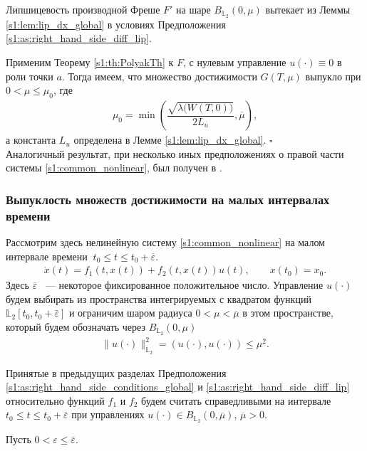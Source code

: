\documentclass[../main.tex]{subfiles}
\begin{document}
Липшицевость производной Фреше $F'$ на шаре $B_{\mathbb{L}_2}(0,\mu)$ вытекает из Леммы \ref{s1:lem:lip_dx_global} в условиях Предположения \ref{s1:as:right_hand_side_diff_lip}. 
 
Применим Теорему \ref{s1:th:PolyakTh} к $F$, с нулевым управление $u(\cdot) \equiv 0$ в роли точки $a$. 
Тогда имеем, что множество достижимости $G(T,\mu)$ выпукло при $ 0 < \mu \leqslant \mu_0 $, где 
\begin{gather}\label{s1:mu0}
 \mu_0 = \min\left( \dfrac{\sqrt{\lambda\big(W(T,0)\big)}}{2L_u}, \overline{\mu} \right), 
\end{gather}
а константа $L_u $ определена в Лемме \ref{s1:lem:lip_dx_global}. 
\hfill$\square$\\[1ex]%
Аналогичный результат, при несколько иных предположениях о правой части системы \eqref{s1:common_nonlinear}, был получен в \cite{Polyak2004}.
 
\subsubsection{Выпуклость множеств достижимости на малых интервалах времени}
\label{s1:small_time_subsection}
Рассмотрим здесь нелинейную систему \eqref{s1:common_nonlinear} на малом интервале времени $\ t_0 \leqslant t \leqslant t_0 + \overline{\varepsilon} $.
\begin{gather}\label{s1:common_nonlinear_small_time}
 \dot{x}(t)=f_1(t,x(t))+f_2(t,x(t))u(t), \qquad x(t_0) = x_0.
\end{gather}
Здесь $ \overline{\varepsilon} $ ~--- некоторое фиксированное положительное число.
Управление $u(\cdot)$ будем выбирать из пространства интегрируемых с квадратом функций $\mathbb{L}_2[t_0,t_0+\bar{\varepsilon}]$ и ограничим шаром радиуса $ 0 < \mu < \overline{\mu} $ в этом пространстве, который будем обозначать через $B_{\mathbb{L}_2}(0, \mu)$
\begin{gather*}
 \lVert u(\cdot)\rVert^2_{\mathbb{L}_2} = \left(u(\cdot),u(\cdot) \right) \leqslant \mu^2.
\end{gather*}

Принятые в предыдущих разделах Предположения \ref{s1:as:right_hand_side_conditions_global} и \ref{s1:as:right_hand_side_diff_lip} относительно функций $f_1$ и $f_2$ будем считать справедливыми на интервале $t_0 \leqslant t \leqslant t_0 + \overline{\varepsilon} $ при управлениях $u(\cdot) \in B_{\mathbb{L}_2}(0, \overline{\mu}) $, $\overline{\mu} > 0$.

Пусть $ 0 < \varepsilon \leqslant \bar{\varepsilon} $.
 
\end{document}
